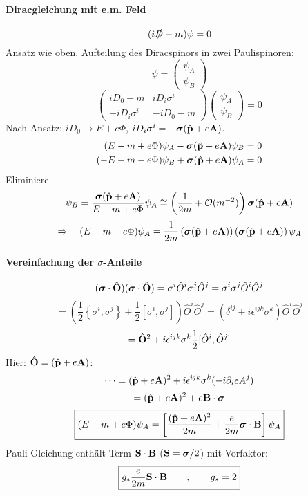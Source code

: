 \documentclass[11pt,a4paper]{report}
\renewcommand{\vec}{\boldsymbol}
\begin{document}
\paragraph{Diracgleichung mit e.m. Feld}
$$(i\slashed{D} - m)\psi = 0$$
Ansatz wie oben. Aufteilung des Diracspinors in zwei Paulispinoren:
$$\psi = \begin{pmatrix}
\psi_A \\ \psi_B
\end{pmatrix}$$
$$\begin{pmatrix}
iD_0 -m & iD_i\sigma^i \\
-iD_i\sigma^i & -iD_0 - m
\end{pmatrix}\begin{pmatrix}
\psi_A \\ \psi_B
\end{pmatrix}=0$$
Nach Ansatz: $iD_0\rightarrow E+e\Phi $, $iD_i\sigma^i = -\vec{\sigma}(\hat{\vf{p}}+e\vf{A})$.
\begin{align*}
(E-m+e\Phi )\psi_A - \vec{\sigma}(\hat{\vf{p}}+e\vf{A})\psi_B &= 0 \\
(-E-m-e\Phi )\psi_B + \vec{\sigma}(\hat{\vf{p}}+e\vf{A})\psi_A &= 0
\end{align*}
Eliminiere 
$$\psi_B = \frac{\vec{\sigma}(\hat{\vf{p}}+e\vf{A})}{E+m+e\Phi}\psi_A \cong \left(\frac{1}{2m}+\mathcal{O}(m^{-2})\right)\vec{\sigma}(\hat{\vf{p}}+e\vf{A})$$
$$\Rightarrow\quad (E-m+e\Phi )\psi_A = \frac{1}{2m}\left(\vec{\sigma}(\hat{\vf{p}}+e\vf{A})\right)\left(\vec{\sigma}(\hat{\vf{p}}+e\vf{A})\right)\psi_A$$
\paragraph{Vereinfachung der $\sigma$-Anteile}
$$(\vec{\sigma}\cdot\hat{\vf{O}})(\vec{\sigma}\cdot\hat{\vf{O}}) = \sigma^i\hat{O}^i\sigma^j\hat{O}^j=\sigma^i\sigma^j\hat{O}^i\hat{O}^j$$
$$=\left(\frac{1}{2}\left\{\sigma^i,\sigma^j\right\} + \frac{1}{2}\left[\sigma^i,\sigma^j\right]\right)\hat{O}^i\hat{O}^j = \left(\delta^{ij}+i\epsilon^{ijk}\sigma^k\right)\hat{O}^i\hat{O}^j$$
$$=\hat{\mathbf{O}}^2+i\epsilon^{ijk}\sigma^k\frac{1}{2}[\hat{O}^i,\hat{O}^j]$$
Hier: $\hat{\mathbf{O}}=(\hat{\mathbf{p}}+e\mathbf{A})$:
$$\cdots = (\hat{\mathbf{p}}+e\mathbf{A})^2 + i\epsilon^{ijk}\sigma^k(-i\partial_ieA^j)$$
$$=(\hat{\vf{p}}+e\vf{A})^2 + e\vf{B}\cdot\vec{\sigma}$$
$$\boxed{(E-m+e\Phi )\psi_A=\left[\frac{(\hat{\vf{p}}+e\vf{A})^2}{2m}+\frac{e}{2m}\vec{\sigma}\cdot\vf{B}\right]\psi_A}$$
Pauli-Gleichung enthält Term $\mathbf{S}\cdot\mathbf{B}$ ($\vf{S}=\vec{\sigma}/2$) mit Vorfaktor:
$$\boxed{g_s\frac{e}{2m}\mathbf{S}\cdot\mathbf{B}\qquad ,\qquad g_s=2}$$
\end{document}
